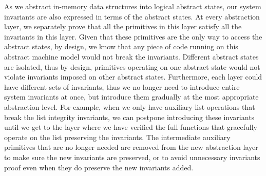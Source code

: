 As we abstract in-memory data structures into logical abstract states, our system invariants
are also expressed in terms of the abstract states. At every abstraction layer, we separately
prove that all the primitives in this layer satisfy all the invariants in this layer. Given that these
primitives are the only way to access the abstract states, by design, we know that any piece of
code running on this abstract machine model would not break the invariants. 
Different abstract states are isolated, thus by design, primitives operating on one abstract
state would not violate invariants imposed on other abstract states.
Furthermore, each
layer could have different sets of invariants, thus we no longer need to introduce entire system
invariants at once, but introduce them gradually at the most appropriate abstraction level.
For example, when we only have auxiliary list operations that break the list integrity invariants,
we can postpone introducing these invariants until we get to the layer where we have
verified the full functions that gracefully operate on the list preserving the invariants.
The intermediate auxiliary primitives that are no longer needed are removed from the new abstraction
layer to make sure the new invariants are preserved, or to avoid unnecessary invariants proof
even when they do preserve the new invariants added.


